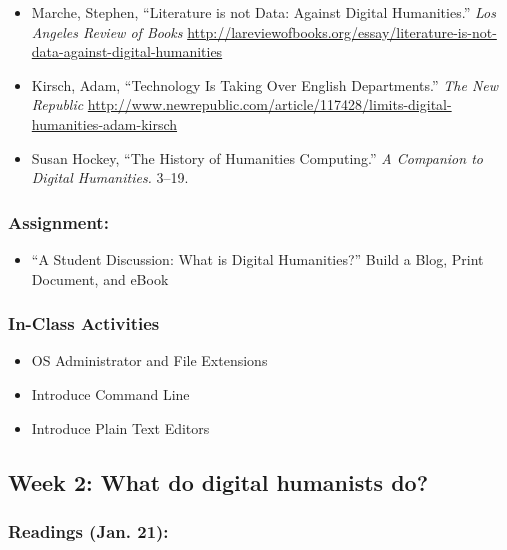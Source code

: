 \documentclass[]{article}
\begin{document}
\begin{itemize}
\itemsep1pt\parskip0pt
\item
  Marche, Stephen, ``Literature is not Data: Against Digital
  Humanities.'' \emph{Los Angeles Review of Books}
  \url{http://lareviewofbooks.org/essay/literature-is-not-data-against-digital-humanities}
\item
  Kirsch, Adam, ``Technology Is Taking Over English Departments.''
  \emph{The New Republic}
  \url{http://www.newrepublic.com/article/117428/limits-digital-humanities-adam-kirsch}
\item
  Susan Hockey, ``The History of Humanities Computing.'' \emph{A
  Companion to Digital Humanities.} 3--19.
\end{itemize}

\subsubsection{Assignment:}\label{assignment}

\begin{itemize}
\itemsep1pt\parskip0pt
\item
  ``A Student Discussion: What is Digital Humanities?'' Build a Blog,
  Print Document, and eBook
\end{itemize}

\subsubsection{In-Class Activities}\label{in-class-activities}

\begin{itemize}
\itemsep1pt\parskip0pt
\item
  OS Administrator and File Extensions
\item
  Introduce Command Line
\item
  Introduce Plain Text Editors
\end{itemize}

\subsection{Week 2: What do digital humanists
do?}\label{week-2-what-do-digital-humanists-do}

\subsubsection{Readings (Jan. 21):}\label{readings-jan.-21}
\end{document}
